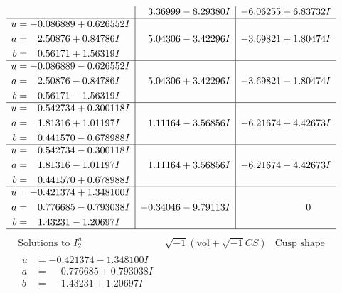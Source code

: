 \documentclass[1p]{elsarticle_modified}
\theoremstyle{definition}
\newcommand{\I}{\sqrt{-1}}
\begin{document}
$$\begin{array}{c|c|c}
 & \phantom{-}3.36999 - 8.29380 I & -6.06255 + 6.83732 I \\ \hline\begin{aligned}
u &= -0.086889 + 0.626552 I \\
a &= \phantom{-}2.50876 + 0.84786 I \\
b &= \phantom{-}0.56171 + 1.56319 I\end{aligned}
 & \phantom{-}5.04306 - 3.42296 I & -3.69821 + 1.80474 I \\ \hline\begin{aligned}
u &= -0.086889 - 0.626552 I \\
a &= \phantom{-}2.50876 - 0.84786 I \\
b &= \phantom{-}0.56171 - 1.56319 I\end{aligned}
 & \phantom{-}5.04306 + 3.42296 I & -3.69821 - 1.80474 I \\ \hline\begin{aligned}
u &= \phantom{-}0.542734 + 0.300118 I \\
a &= \phantom{-}1.81316 + 1.01197 I \\
b &= \phantom{-}0.441570 - 0.678988 I\end{aligned}
 & \phantom{-}1.11164 - 3.56856 I & -6.21674 + 4.42673 I \\ \hline\begin{aligned}
u &= \phantom{-}0.542734 - 0.300118 I \\
a &= \phantom{-}1.81316 - 1.01197 I \\
b &= \phantom{-}0.441570 + 0.678988 I\end{aligned}
 & \phantom{-}1.11164 + 3.56856 I & -6.21674 - 4.42673 I \\ \hline\begin{aligned}
u &= -0.421374 + 1.348100 I \\
a &= \phantom{-}0.776685 - 0.793038 I \\
b &= \phantom{-}1.43231 - 1.20697 I\end{aligned}
 & -0.34046 - 9.79113 I & \phantom{-0.000000 } 0\\
 \hline 
 \end{array}$$\newpage$$\begin{array}{c|c|c}  
\text{Solutions to }I^u_{2}& \I (\text{vol} + \sqrt{-1}CS) & \text{Cusp shape}\\
 \hline 
\begin{aligned}
u &= -0.421374 - 1.348100 I \\
a &= \phantom{-}0.776685 + 0.793038 I \\
b &= \phantom{-}1.43231 + 1.20697 I\end{aligned}

\end{array}$$
\end{document}
